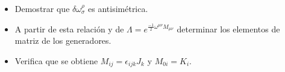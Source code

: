\documentclass{article}
\begin{document}
\begin{itemize}
\item Demostrar que $ \delta \omega ^\rho _\sigma$ es antisimétrica.

\item A partir de esta relación y de $\Lambda =e^{\frac{-1}{2}\omega ^{\mu \nu}M_{\mu \nu}}$ determinar los elementos de matriz de los generadores.

\item Verifica que se obtiene $M_{ij}=\epsilon _{ijk}J_k$ y $M_{0i}=K_i$.
\end{itemize}
\end{document}
